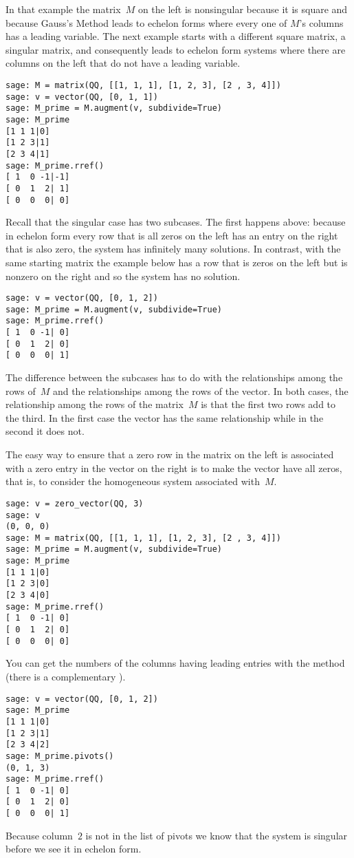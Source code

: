 In that example the matrix~$M$ on the left is nonsingular because it is 
square and because Gauss's Method leads to echelon forms where every one of
$M$'s columns has a leading variable.
The next example starts with a different square matrix, a 
singular matrix, and consequently leads to 
echelon form systems where there are columns on the left 
that do not have a leading variable. 
\begin{lstlisting}
sage: M = matrix(QQ, [[1, 1, 1], [1, 2, 3], [2 , 3, 4]])    
sage: v = vector(QQ, [0, 1, 1]) 
sage: M_prime = M.augment(v, subdivide=True)
sage: M_prime
[1 1 1|0]
[1 2 3|1]
[2 3 4|1]
sage: M_prime.rref()
[ 1  0 -1|-1]
[ 0  1  2| 1]
[ 0  0  0| 0]  
\end{lstlisting}
Recall that the singular case  
has two subcases.
The first happens above: because in echelon form
every row that is all zeros on the
left has an entry on the right that is also zero,
the system has infinitely many solutions.
In contrast, with the same starting matrix
the example below has a row that is zeros on the left but is nonzero
on the right and so the system has no solution.
\begin{lstlisting}
sage: v = vector(QQ, [0, 1, 2])             
sage: M_prime = M.augment(v, subdivide=True)
sage: M_prime.rref()                        
[ 1  0 -1| 0]
[ 0  1  2| 0]
[ 0  0  0| 1]
\end{lstlisting}
The difference between the subcases
has to do with the relationships among  
the rows of~$M$ and the relationships among the rows of the vector.
In both cases, the relationship among the rows of the matrix~$M$
is that the first two rows add to the third.
In the first case the vector has the same relationship while in the second
it does not.

The easy way to ensure that a zero row in the matrix 
on the left is associated with a zero
entry in the vector on the right is to make the vector have all zeros, that is,
to consider the homogeneous system associated with~$M$.
\begin{lstlisting}
sage: v = zero_vector(QQ, 3)
sage: v
(0, 0, 0)
sage: M = matrix(QQ, [[1, 1, 1], [1, 2, 3], [2 , 3, 4]]) 
sage: M_prime = M.augment(v, subdivide=True)
sage: M_prime
[1 1 1|0]
[1 2 3|0]
[2 3 4|0]
sage: M_prime.rref()
[ 1  0 -1| 0]
[ 0  1  2| 0]
[ 0  0  0| 0]
\end{lstlisting}

You can get the numbers of the columns having leading entries with 
the  method
(there is a complementary ).
\begin{lstlisting}
sage: v = vector(QQ, [0, 1, 2])
sage: M_prime                  
[1 1 1|0]
[1 2 3|1]
[2 3 4|2]
sage: M_prime.pivots()         
(0, 1, 3)
sage: M_prime.rref()
[ 1  0 -1| 0]
[ 0  1  2| 0]
[ 0  0  0| 1]  
\end{lstlisting}
Because column~$2$ is not in the list of pivots we know that the
system is singular before we see it in echelon form.

